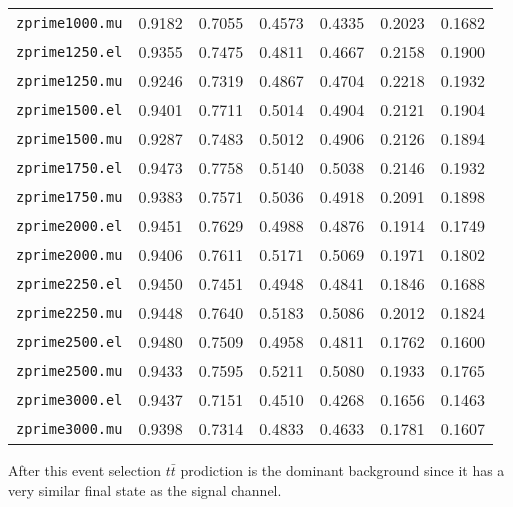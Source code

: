 \begin{table}
{\begin{tabular}{c|cccccc}
    \texttt{zprime1000.mu} & 0.9182 & 0.7055  & 0.4573 & 0.4335  & 0.2023     & 0.1682\\
    \texttt{zprime1250.el} & 0.9355 & 0.7475  & 0.4811 & 0.4667  & 0.2158      & 0.1900 \\
    \texttt{zprime1250.mu} & 0.9246 & 0.7319  & 0.4867 & 0.4704  & 0.2218      & 0.1932\\
    \texttt{zprime1500.el} & 0.9401 & 0.7711  & 0.5014 & 0.4904  & 0.2121      & 0.1904\\
    \texttt{zprime1500.mu} & 0.9287 & 0.7483  & 0.5012 & 0.4906  & 0.2126      & 0.1894\\
    \texttt{zprime1750.el} & 0.9473 & 0.7758  & 0.5140 & 0.5038  & 0.2146      & 0.1932\\
    \texttt{zprime1750.mu} & 0.9383 & 0.7571  & 0.5036 & 0.4918  & 0.2091      & 0.1898\\
    \texttt{zprime2000.el} & 0.9451 & 0.7629  & 0.4988 & 0.4876  & 0.1914     & 0.1749\\
    \texttt{zprime2000.mu} & 0.9406 & 0.7611  & 0.5171 & 0.5069  & 0.1971      & 0.1802\\
    \texttt{zprime2250.el} & 0.9450 & 0.7451  & 0.4948 & 0.4841  & 0.1846      & 0.1688\\
    \texttt{zprime2250.mu} & 0.9448 & 0.7640  & 0.5183 & 0.5086  & 0.2012      & 0.1824\\
    \texttt{zprime2500.el} & 0.9480 & 0.7509  & 0.4958 & 0.4811  & 0.1762      & 0.1600\\
    \texttt{zprime2500.mu} & 0.9433 & 0.7595  & 0.5211 & 0.5080  & 0.1933      & 0.1765\\
    \texttt{zprime3000.el} & 0.9437 & 0.7151  & 0.4510 & 0.4268  & 0.1656      & 0.1463\\
    \texttt{zprime3000.mu} & 0.9398 & 0.7314  & 0.4833 & 0.4633  & 0.1781      & 0.1607\\
    \bottomrule
    \end{tabular}}
\end{table}

After this event selection $t\bar{t}$ prodiction is the dominant background since it has a very similar final state as the signal channel.
